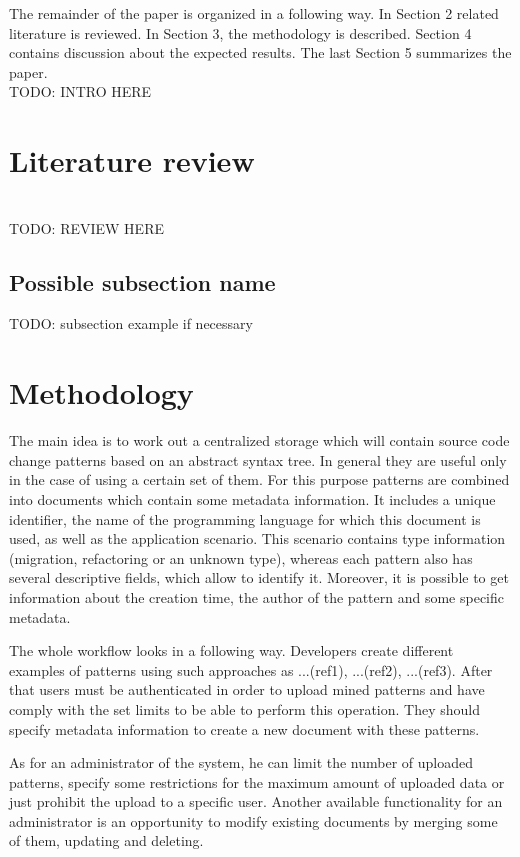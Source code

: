 \documentclass[letterpaper, 10 pt, conference]{ieeeconf}  %
\begin{document}
The remainder of the paper is organized in a following way. In
Section 2 related literature is reviewed. In Section 3, the
methodology is described. Section 4 contains discussion about the expected results. The last Section 5 summarizes the paper.
\\ TODO: INTRO HERE

\section{Literature review}
\\ TODO: REVIEW HERE
\subsection{Possible subsection name}

TODO: subsection example if necessary

\section{Methodology}

The main idea is to work out a centralized storage which will contain
source code change patterns based on an abstract syntax tree. In
general they are useful only in the case of using a certain set of
them. For this purpose patterns are combined into documents which
contain some metadata information. It includes a unique identifier,
the name of the programming language for which this document is used,
as well as the application scenario. This scenario contains type
information (migration, refactoring or an unknown type), whereas each
pattern also has several descriptive fields, which allow to identify
it. Moreover, it is possible to get information about the creation
time, the author of the pattern and some specific metadata.

The whole workflow looks in a following way. Developers create
different examples of patterns using such approaches as ...(ref1),
...(ref2), ...(ref3). After that users must be authenticated in order
to upload mined patterns and have comply with the set limits to be
able to perform this operation. They should specify metadata
information to create a new document with these patterns. 

As for an administrator of the system, he can limit the number of
uploaded patterns, specify some restrictions for the maximum amount of
uploaded data or just prohibit the upload to a specific user. Another
available functionality for an administrator is an opportunity to
modify existing documents by merging some of them, updating and
deleting.
\end{document}
